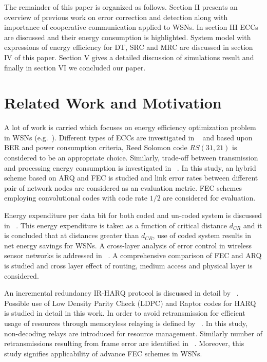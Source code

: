 \documentclass{sig-alternate}
\begin{document}
The remainder of this paper is organized as follows. Section II presents an overview of previous work on error correction and detection along with importance of cooperative communication applied to WSNs. In section III ECCs are discussed and their energy consumption is highlighted. System model with expressions of energy efficiency for DT, SRC and MRC are discussed in section IV of this paper. Section V gives a detailed discussion of simulations result and finally in section VI we concluded our paper.

\section{Related Work and Motivation}
\label{sec:format}

A lot of work is carried which focuses on energy efficiency optimization problem in WSNs (e.g.~\cite{11, 12, 14, 16}). Different types of ECCs are investigated in ~\cite{2} and based upon BER and power consumption criteria, Reed Solomon code $RS(31,21)$ is considered to be an appropriate choice. Similarly, trade-off between transmission and processing energy consumption is investigated in ~\cite{4}. In this study, an hybrid scheme based on ARQ and FEC is studied and link error rates between different pair of network nodes are considered as an evaluation metric. FEC schemes employing convolutional codes with code rate $1/2$ are considered for evaluation.

Energy expenditure per data bit for both coded and un-coded system is discussed in ~\cite{1}. This energy expenditure is taken as a function of critical distance $d_{CR}$ and it is concluded that at distances greater than $d_{CR}$, use of coded system results in net energy savings for WSNs. A cross-layer analysis of error control in wireless sensor networks is addressed in ~\cite{8}. A comprehensive comparison of FEC and ARQ is studied and cross layer effect of routing, medium access and physical layer is considered.

An incremental redundancy IR-HARQ protocol is discussed in detail by ~\cite{3}. Possible use of Low Density Parity Check (LDPC) and Raptor codes for HARQ is studied in detail in this work. In order to avoid retransmission for efficient usage of resources through memoryless relaying is defined by ~\cite{9}. In this study, non-decoding relays are introduced for resource management. Similarly number of retransmissions resulting from frame error are identified in ~\cite{5}. Moreover, this study signifies applicability of advance FEC schemes in WSNs.
\end{document}
